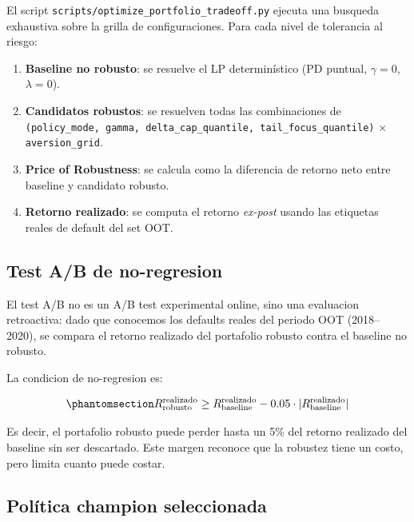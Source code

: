\documentclass[
  spanish,
  11pt,
  letterpaper,
]{scrbook}
\providecommand{\tightlist}{%
  \setlength{\itemsep}{0pt}\setlength{\parskip}{0pt}}
\theoremstyle{plain}
\theoremstyle{remark}
\begin{document}
El script \texttt{scripts/optimize\_portfolio\_tradeoff.py} ejecuta una
busqueda exhaustiva sobre la grilla de configuraciones. Para cada nivel
de tolerancia al riesgo:

\begin{enumerate}
\def\labelenumi{\arabic{enumi}.}
\tightlist
\item
  \textbf{Baseline no robusto}: se resuelve el LP determinístico (PD
  puntual, \(\gamma = 0\), \(\lambda = 0\)).
\item
  \textbf{Candidatos robustos}: se resuelven todas las combinaciones de
  \texttt{(policy\_mode,\ gamma,\ delta\_cap\_quantile,\ tail\_focus\_quantile)}
  \(\times\) \texttt{aversion\_grid}.
\item
  \textbf{Price of Robustness}: se calcula como la diferencia de retorno
  neto entre baseline y candidato robusto.
\item
  \textbf{Retorno realizado}: se computa el retorno \emph{ex-post}
  usando las etiquetas reales de default del set OOT.
\end{enumerate}

\subsection{Test A/B de no-regresion}\label{sec-ab-no-regression}

El test A/B no es un A/B test experimental online, sino una evaluacion
retroactiva: dado que conocemos los defaults reales del periodo OOT
(2018--2020), se compara el retorno realizado del portafolio robusto
contra el baseline no robusto.

La condicion de no-regresion es:

\begin{equation}\protect\phantomsection\label{eq-ab-no-regression}{
R_{\text{robusto}}^{\text{realizado}} \geq R_{\text{baseline}}^{\text{realizado}} - 0.05 \cdot |R_{\text{baseline}}^{\text{realizado}}|
}\end{equation}

Es decir, el portafolio robusto puede perder hasta un 5\% del retorno
realizado del baseline sin ser descartado. Este margen reconoce que la
robustez tiene un costo, pero limita cuanto puede costar.

\subsection{Política champion
seleccionada}\label{poluxedtica-champion-seleccionada}
\end{document}
